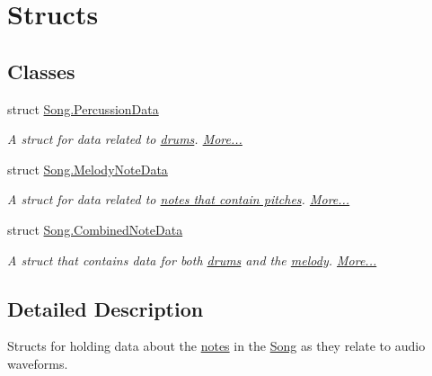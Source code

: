 \hypertarget{group___song_structs}{}\section{Structs}
\label{group___song_structs}
\subsection*{Classes}
\begin{DoxyCompactItemize}
\item 
struct \hyperlink{group___song_structs_struct_song_1_1_percussion_data}{Song.\+Percussion\+Data}
\begin{DoxyCompactList}\small\item\em A struct for data related to \hyperlink{group___music_structs_struct_music_1_1_percussion_note}{drums}.  \hyperlink{group___song_structs_struct_song_1_1_percussion_data}{More...}\end{DoxyCompactList}\item 
struct \hyperlink{group___song_structs_struct_song_1_1_melody_note_data}{Song.\+Melody\+Note\+Data}
\begin{DoxyCompactList}\small\item\em A struct for data related to \hyperlink{group___music_structs_struct_music_1_1_melody_note}{notes that contain pitches}.  \hyperlink{group___song_structs_struct_song_1_1_melody_note_data}{More...}\end{DoxyCompactList}\item 
struct \hyperlink{group___song_structs_struct_song_1_1_combined_note_data}{Song.\+Combined\+Note\+Data}
\begin{DoxyCompactList}\small\item\em A struct that contains data for both \hyperlink{group___music_structs_struct_music_1_1_percussion_note}{drums} and the \hyperlink{group___music_structs_struct_music_1_1_melody_note}{melody}.  \hyperlink{group___song_structs_struct_song_1_1_combined_note_data}{More...}\end{DoxyCompactList}\end{DoxyCompactItemize}


\subsection{Detailed Description}
Structs for holding data about the \hyperlink{group___music_structs_struct_music_1_1_combined_note}{notes} in the \hyperlink{class_song}{Song} as they relate to audio waveforms. 

